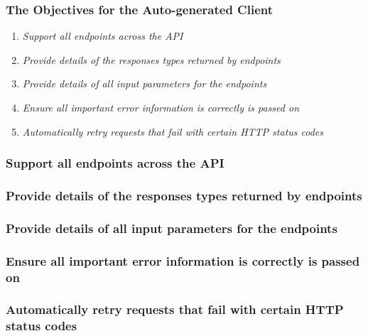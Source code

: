 \subsubsection{The Objectives for the Auto-generated Client}
\begin{enumerate}
    \item \textit{Support all endpoints across the API}
    \item \textit{Provide details of the responses types returned by endpoints}
    \item \textit{Provide details of all input parameters for the endpoints}
    \item \textit{Ensure all important error information is correctly is passed on}
    \item \textit{Automatically retry requests that fail with certain HTTP status codes}
\end{enumerate}
\subsubsection{Support all endpoints across the API}
\subsubsection{Provide details of the responses types returned by endpoints}
\subsubsection{Provide details of all input parameters for the endpoints}
\subsubsection{Ensure all important error information is correctly is passed on}
\subsubsection{Automatically retry requests that fail with certain HTTP status codes}